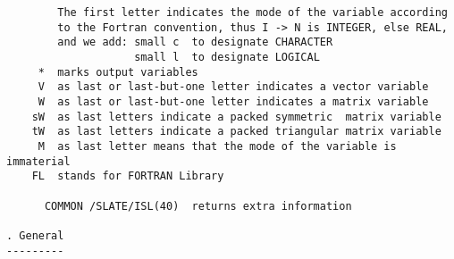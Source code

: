 \spsmall

\begin{verbatim}
        The first letter indicates the mode of the variable according
        to the Fortran convention, thus I -> N is INTEGER, else REAL,
        and we add: small c  to designate CHARACTER
                    small l  to designate LOGICAL
     *  marks output variables
     V  as last or last-but-one letter indicates a vector variable
     W  as last or last-but-one letter indicates a matrix variable
    sW  as last letters indicate a packed symmetric  matrix variable
    tW  as last letters indicate a packed triangular matrix variable
     M  as last letter means that the mode of the variable is immaterial
    FL  stands for FORTRAN Library

      COMMON /SLATE/ISL(40)  returns extra information

. General
---------


\end{verbatim}
